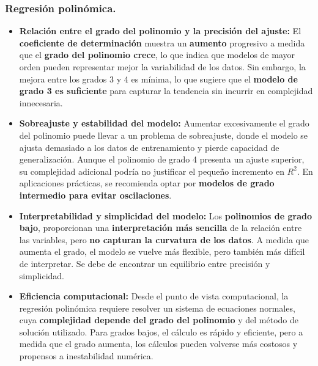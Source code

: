 \documentclass{article}
\begin{document}
\subsubsection*{Regresión polinómica.}
\begin{itemize}
    \item \textbf{Relación entre el grado del polinomio y la precisión del ajuste:} El \textbf{coeficiente de determinación} muestra un \textbf{aumento} progresivo a medida que el \textbf{grado del polinomio crece}, lo que indica que modelos de mayor orden pueden representar mejor la variabilidad de los datos. Sin embargo, la mejora entre los grados 3 y 4 es mínima, lo que sugiere que el \textbf{modelo de grado 3 es suficiente} para capturar la tendencia sin incurrir en complejidad innecesaria.
    \item \textbf{Sobreajuste y estabilidad del modelo:} Aumentar excesivamente el grado del polinomio puede llevar a un problema de sobreajuste, donde el modelo se ajusta demasiado a los datos de entrenamiento y pierde capacidad de generalización. Aunque el polinomio de grado 4 presenta un ajuste superior, su complejidad adicional podría no justificar el pequeño incremento en $R^2$. En aplicaciones prácticas, se recomienda optar por \textbf{modelos de grado intermedio para evitar oscilaciones}.
    \item  \textbf{Interpretabilidad y simplicidad del modelo:} Los \textbf{polinomios de grado bajo}, proporcionan una \textbf{interpretación más sencilla} de la relación entre las variables, pero \textbf{no capturan la curvatura de los datos}. A medida que aumenta el grado, el modelo se vuelve más flexible, pero también más difícil de interpretar. Se debe de encontrar un equilibrio entre precisión y simplicidad.
    \item \textbf{Eficiencia computacional:} Desde el punto de vista computacional, la regresión polinómica requiere resolver un sistema de ecuaciones normales, cuya \textbf{complejidad depende del grado del polinomio} y del método de solución utilizado. Para grados bajos, el cálculo es rápido y eficiente, pero a medida que el grado aumenta, los cálculos pueden volverse más costosos y propensos a inestabilidad numérica.


\end{itemize}
\end{document}
